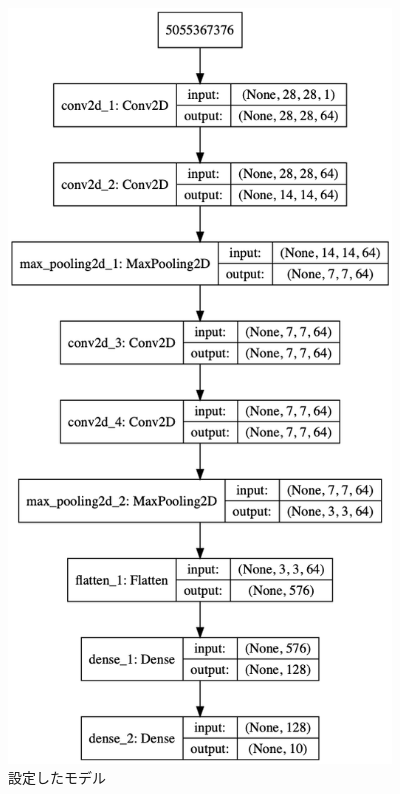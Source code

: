 \documentclass{jarticle}
\begin{document}
\begin{figure}[h]
\centering
\includegraphics[height=20cm]{model.png}
\caption{設定したモデル}
\label{設定モデル}
\end{figure}


\clearpage
\end{document}
